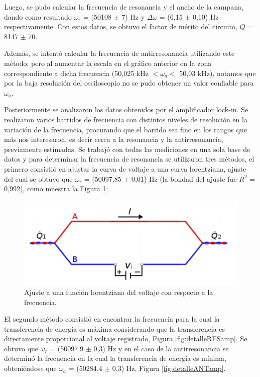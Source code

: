 \documentclass[twoside,twocolumn,a4paper]{article}
\begin{document}
Luego, se pudo calcular la frecuencia de resonancia y el ancho de la campana, dando como resultado $\omega_{r}$ = (50108 $\pm$ 7) Hz y $\Delta \omega$ = (6,15 $\pm$ 0,10) Hz respectivamente. Con estos datos, se obtuvo el factor de m\'erito del circuito, $Q$ = 8147 $\pm$ 70. \newline

\par
Adem\'as, se intent\'o calcular la frecuencia de antirresonancia utilizando este m\'etodo; pero al aumentar la escala en el gr\'afico anterior en la zona correspondiente a dicha frecuencia (50,025 kHz $< \omega_{a} <$ 50,03 kHz), notamos que por la baja resoluci\'on del osciloscopio no se pudo obtener un valor confiable para $\omega_{a}$. \newline


\par
Posteriormente se analizaron los datos obtenidos por el amplificador lock-in. Se realizaron varios barridos de frecuencia con distintos niveles de resoluci\'on en la variaci\'on de la frecuencia, procurando que el barrido sea fino en los rangos que m\'as nos interesaron, es decir cerca a la resonancia y la antirresonancia, previamente estimadas. Se trabaj\'o con todas las mediciones en una sola base de datos y para determinar la frecuencia de resonancia se utilizaron tres m\'etodos, el primero consisti\'o en ajustar la curva de voltaje a una curva lorentziana, ajuste del cual se obtuvo que $\omega_{r}$ = (50097,85 $\pm$ 0,01) Hz (la bondad del ajuste fue $R^{2}$ = 0,992), como muestra la Figura \ref{fig:ajuste}:


\begin{figure}[H]
\includegraphics[width=\linewidth]{peltier.jpg}
\caption{Ajuste a una funci\'on lorentziana del voltaje con respecto a la frecuencia.}
\label{fig:ajuste}
\end{figure}


El segundo m\'etodo consisti\'o en encontrar la frecuencia para la cual la transferencia de energ\'ia es m\'axima considerando que la transferencia es directamente proporcional al voltaje registrado,  Figura \ref{fig:detalleRESamp}. Se obtuvo que $\omega_{r}$ = (50097,9 $\pm$ 0,3) Hz y en el caso de la antirresonancia se determin\'o la frecuencia en la cual la transferencia de energ\'ia es m\'inima, obteni\'endose que $\omega_{a}$ = (50284,4 $\pm$ 0,3) Hz, Figura \ref{fig:detalleANTamp}.
\end{document}
